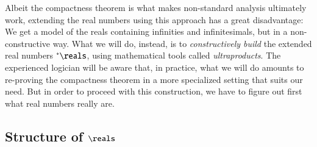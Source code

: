 \documentclass[adraft, copyright,creativecommons,sharealike,noncommercial]{eptcs}
\newcommand{\nstar}{{^*}}
\begin{document}
Albeit the compactness theorem is what makes non-standard analysis ultimately work, extending the real numbers using this approach has a great disadvantage: We get a model of the reals containing infinities and infinitesimals, but in a non-constructive way. What we will do, instead, is to \emph{constructively build} the extended real numbers $\nstar \reals$, using mathematical tools called \emph{ultraproducts}. The experienced logician will be aware that, in practice, what we will do amounts to re-proving the compactness theorem in a more specialized setting that suits our need. But in order to proceed with this construction, we have to figure out first what real numbers really are.

\subsection{Structure of $\reals$}
\end{document}
